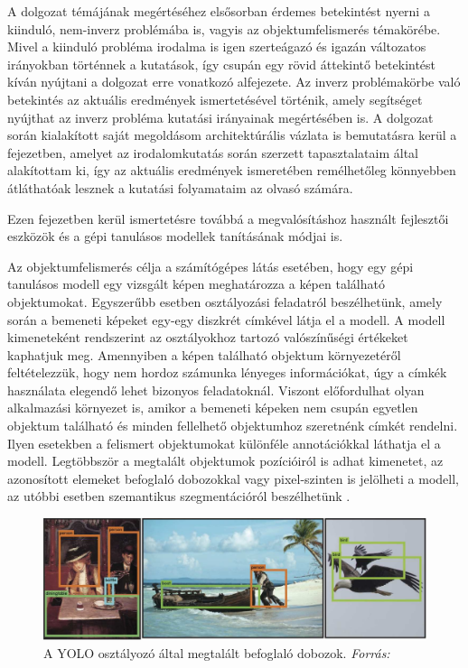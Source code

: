 
A dolgozat témájának megértéséhez elsősorban érdemes betekintést nyerni a kiinduló, nem-inverz problémába is, vagyis az objektumfelismerés témakörébe. Mivel a kiinduló probléma irodalma is igen szerteágazó és igazán változatos irányokban történnek a kutatások, így csupán egy rövid áttekintő betekintést kíván nyújtani a dolgozat erre vonatkozó alfejezete.
Az inverz problémakörbe való betekintés az aktuális eredmények ismertetésével történik, amely segítséget nyújthat az inverz probléma kutatási irányainak megértésében is. A dolgozat során kialakított saját megoldásom architektúrális vázlata is bemutatásra kerül a fejezetben, amelyet az irodalomkutatás során szerzett tapasztalataim által alakítottam ki, így az aktuális eredmények ismeretében remélhetőleg könnyebben átláthatóak lesznek a kutatási folyamataim az olvasó számára.

Ezen fejezetben kerül ismertetésre továbbá a megvalósításhoz használt fejlesztői eszközök és a gépi tanulásos modellek tanításának módjai is.

Az objektumfelismerés célja a számítógépes látás esetében, hogy egy gépi tanulásos modell egy vizsgált képen meghatározza a képen található objektumokat. Egyszerűbb esetben osztályozási feladatról beszélhetünk, amely során a bemeneti képeket egy-egy diszkrét címkével látja el a modell. A modell kimeneteként rendszerint az osztályokhoz tartozó valószínűségi értékeket kaphatjuk meg. Amennyiben a képen található objektum környezetéről feltételezzük, hogy nem hordoz számunka lényeges információkat, úgy a címkék használata elegendő lehet bizonyos feladatoknál. Viszont előfordulhat olyan alkalmazási környezet is, amikor a bemeneti képeken nem csupán egyetlen objektum található és minden fellelhető objektumhoz szeretnénk címkét rendelni. Ilyen esetekben a felismert objektumokat különféle annotációkkal láthatja el a modell. Legtöbbször a megtalált objektumok pozícióiról is adhat kimenetet, az azonosított elemeket befoglaló dobozokkal \cite{redmon2016you} vagy pixel-szinten is jelölheti a modell, az utóbbi esetben szemantikus szegmentációról beszélhetünk \cite{long2015fully}.

\begin{figure}[h]
	\centering
	\includegraphics[width=15cm]{images/yolo.png}
	\caption{A YOLO osztályozó által megtalált befoglaló dobozok. \textit{Forrás:} \cite{redmon2016you}}
	\label{fig:yolo}
\end{figure}

